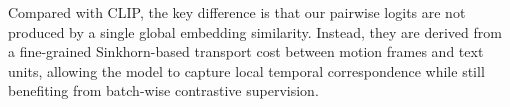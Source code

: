 Compared with CLIP, the key difference is that our pairwise logits are not produced by a single global embedding similarity. Instead, they are derived from a fine-grained Sinkhorn-based transport cost between motion frames and text units, allowing the model to capture local temporal correspondence while still benefiting from batch-wise contrastive supervision.




